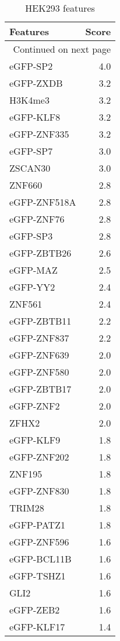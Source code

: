 \begin{longtable}{lr}
\caption{HEK293 features}\\
\toprule
     Features &  Score \\
\midrule
\endhead
\midrule
\multicolumn{2}{r}{{Continued on next page}} \\
\midrule
\endfoot

\bottomrule
\endlastfoot
     eGFP-SP2 &    4.0 \\
    eGFP-ZXDB &    3.2 \\
      H3K4me3 &    3.2 \\
    eGFP-KLF8 &    3.2 \\
  eGFP-ZNF335 &    3.2 \\
     eGFP-SP7 &    3.0 \\
      ZSCAN30 &    3.0 \\
       ZNF660 &    2.8 \\
 eGFP-ZNF518A &    2.8 \\
   eGFP-ZNF76 &    2.8 \\
     eGFP-SP3 &    2.8 \\
  eGFP-ZBTB26 &    2.6 \\
     eGFP-MAZ &    2.5 \\
     eGFP-YY2 &    2.4 \\
       ZNF561 &    2.4 \\
  eGFP-ZBTB11 &    2.2 \\
  eGFP-ZNF837 &    2.2 \\
  eGFP-ZNF639 &    2.0 \\
  eGFP-ZNF580 &    2.0 \\
  eGFP-ZBTB17 &    2.0 \\
    eGFP-ZNF2 &    2.0 \\
        ZFHX2 &    2.0 \\
    eGFP-KLF9 &    1.8 \\
  eGFP-ZNF202 &    1.8 \\
       ZNF195 &    1.8 \\
  eGFP-ZNF830 &    1.8 \\
       TRIM28 &    1.8 \\
   eGFP-PATZ1 &    1.8 \\
  eGFP-ZNF596 &    1.6 \\
  eGFP-BCL11B &    1.6 \\
   eGFP-TSHZ1 &    1.6 \\
         GLI2 &    1.6 \\
    eGFP-ZEB2 &    1.6 \\
   eGFP-KLF17 &    1.4 \\

\end{longtable}
